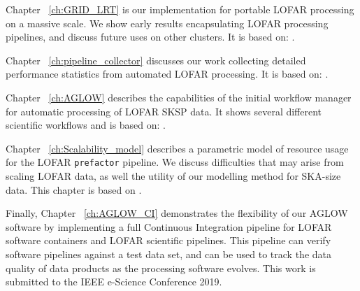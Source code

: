 Chapter ~\ref{ch:GRID_LRT} is our implementation for portable LOFAR processing on a massive scale. We show early results encapsulating LOFAR processing pipelines, and discuss future uses on other clusters. It is based on:  .

Chapter ~\ref{ch:pipeline_collector} discusses our work collecting detailed performance statistics from automated LOFAR processing. It is based on: .

Chapter ~\ref{ch:AGLOW} describes the capabilities of the initial workflow manager for automatic processing of LOFAR SKSP data. It shows several different scientific workflows and is based on: .

Chapter ~\ref{ch:Scalability_model}  describes a parametric model of resource usage for the LOFAR \texttt{prefactor} pipeline. We discuss difficulties that may arise from scaling LOFAR data, as well the utility of our modelling method for SKA-size data. This chapter is  based on .

Finally, Chapter ~\ref{ch:AGLOW_CI} demonstrates the flexibility of our AGLOW software by implementing a full Continuous Integration pipeline for LOFAR software containers and LOFAR scientific pipelines. This pipeline can verify software pipelines against a test data set, and can be used to track the data quality of data products as the processing software evolves. This work is submitted to the IEEE e-Science Conference 2019.
